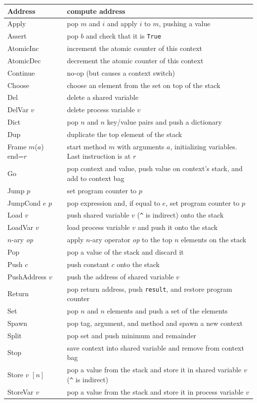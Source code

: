 \documentclass{report}
\begin{document}
\vspace{1em}
\begin{tabular}{|l|l|}
\hline
Address & compute address \\
\hline
Apply & pop $m$ and $i$ and apply $i$ to $m$, pushing a value \\
\hline
Assert & pop $b$ and check that it is \texttt{True} \\
\hline
AtomicInc & increment the atomic counter of this context \\
\hline
AtomicDec & decrement the atomic counter of this context \\
\hline
Continue & no-op (but causes a context switch) \\
\hline
Choose & choose an element from the set on top of the stack \\
\hline
Del & delete a shared variable \\
\hline
DelVar $v$ & delete process variable $v$ \\
\hline
Dict & pop $n$ and $n$ key/value pairs and push a dictionary \\
\hline
Dup & duplicate the top element of the stack \\
\hline
Frame $m$($a$) end=$r$& start method $m$ with arguments $a$,
initializing variables.  Last instruction is at $r$ \\
\hline
Go & pop context and value, push value on context's stack, and add to context bag \\
\hline
Jump $p$ & set program counter to $p$ \\
\hline
JumpCond $e$ $p$ & pop expression and, if equal to $e$, set program counter to $p$ \\
\hline
Load $v$ & push shared variable $v$ (\texttt{\^} is indirect) onto the stack \\
\hline
LoadVar $v$ & load process variable $v$ and push it onto the stack \\
\hline
$n$-ary \textit{op} & apply $n$-ary operator \textit{op} to the top $n$ elements on the stack \\
\hline
Pop & pop a value of the stack and discard it \\
\hline
Push $c$ & push constant $c$ onto the stack \\
\hline
PushAddress $v$ & push the address of shared variable $v$ \\
\hline
Return & pop return address, push \texttt{result}, and restore program counter \\
\hline
Set & pop $n$ and $n$ elements and push a set of the elements \\
\hline
Spawn & pop tag, argument, and method and spawn a new context \\
\hline
Split & pop set and push minimum and remainder \\
\hline
Stop & save context into shared variable and remove from context bag \\
\hline
Store $v$ $[n]$ & pop a value from the stack and store it in shared variable $v$ (\texttt{\^} is indirect) \\
\hline
StoreVar $v$ & pop a value from the stack and store it in process variable $v$ \\
\hline
\end{tabular}
\end{document}
